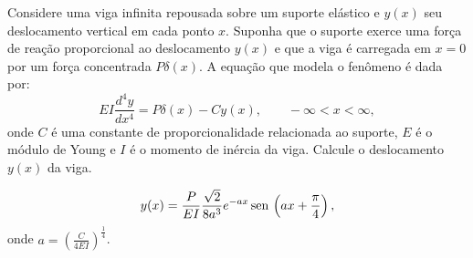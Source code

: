 \begin{Exercise} Considere uma viga infinita repousada sobre um suporte elástico e $y(x)$ seu deslocamento vertical em cada ponto $x$. Suponha que o suporte exerce uma força de reação proporcional ao deslocamento $y(x)$ e que a viga é carregada em $x=0$ por um força concentrada $P\delta(x)$. A equação que modela o fenômeno é dada por:
\begin{equation}
EI\frac{d^4 y}{dx^4}=P\delta(x)-Cy(x),\qquad -\infty<x<\infty,
\end{equation}
onde $C$ é uma constante de proporcionalidade relacionada ao suporte, $E$ é o módulo de Young e $I$ é o momento de inércia da viga. Calcule o deslocamento $y(x)$ da viga.
\end{Exercise}
\begin{Answer}
\begin{eqnarray*}
y(x)=\frac{P}{EI}\frac{\sqrt{2}}{8a^3}e^{-ax}\operatorname{sen}\,\left(ax+\frac{\pi}{4}\right),
\end{eqnarray*}
onde $a=\left(\frac{C}{4EI}\right)^{\frac{1}{4}}$.
\end{Answer}
